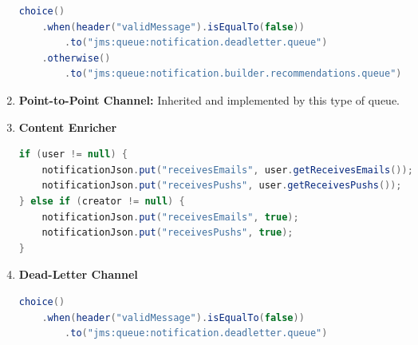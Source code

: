 \documentclass{article}
\begin{document}
\begin{enumerate}
\begin{lstlisting}[language=Java, caption={Content-Based Router for Notification Engine}]
choice()
    .when(header("validMessage").isEqualTo(false))
        .to("jms:queue:notification.deadletter.queue")
    .otherwise()
        .to("jms:queue:notification.builder.recommendations.queue")
\end{lstlisting}
    \item \textbf{Point-to-Point Channel:} Inherited and implemented by this type of queue.
    \item \textbf{Content Enricher}
\begin{lstlisting}[language=Java, caption={Content Enricher for Notification Engine}]
if (user != null) {
    notificationJson.put("receivesEmails", user.getReceivesEmails());
    notificationJson.put("receivesPushs", user.getReceivesPushs());
} else if (creator != null) {
    notificationJson.put("receivesEmails", true);
    notificationJson.put("receivesPushs", true);
}
\end{lstlisting}
    \item \textbf{Dead-Letter Channel}
\begin{lstlisting}[language=Java, caption={Dead-Letter Channel for Notification Engine}]
choice()
    .when(header("validMessage").isEqualTo(false))
        .to("jms:queue:notification.deadletter.queue")
\end{lstlisting}
\end{enumerate}
\end{document}
